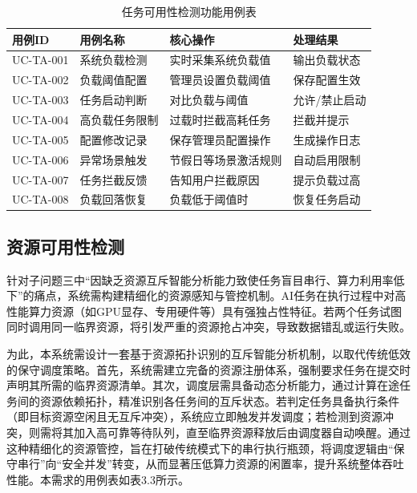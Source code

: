 \begin{table}[htbp]
    \centering
    \caption{任务可用性检测功能用例表}
    \begin{tabular}{llll}
        \toprule
        \textbf{用例ID} & \textbf{用例名称} & \textbf{核心操作} & \textbf{处理结果} \\
        \midrule
        UC-TA-001 & 系统负载检测 & 实时采集系统负载值 & 输出负载状态 \\
        UC-TA-002 & 负载阈值配置 & 管理员设置负载阈值 & 保存配置生效 \\
        UC-TA-003 & 任务启动判断 & 对比负载与阈值 & 允许/禁止启动 \\
        UC-TA-004 & 高负载任务限制 & 过载时拦截高耗任务 & 拦截并提示 \\
        UC-TA-005 & 配置修改记录 & 保存管理员配置操作 & 生成操作日志 \\
        UC-TA-006 & 异常场景触发 & 节假日等场景激活规则 & 自动启用限制 \\
        UC-TA-007 & 任务拦截反馈 & 告知用户拦截原因 & 提示负载过高 \\
        UC-TA-008 & 负载回落恢复 & 负载低于阈值时 & 恢复任务启动 \\
        \bottomrule
    \end{tabular}
    \label{tab:task_availability_cases}
\end{table}

\subsection{资源可用性检测}

针对子问题三中“因缺乏资源互斥智能分析能力致使任务盲目串行、算力利用率低下”的痛点，系统需构建精细化的资源感知与管控机制。AI任务在执行过程中对高性能算力资源（如GPU显存、专用硬件等）具有强独占性特征。若两个任务试图同时调用同一临界资源，将引发严重的资源抢占冲突，导致数据错乱或运行失败。

为此，本系统需设计一套基于资源拓扑识别的互斥智能分析机制，以取代传统低效的保守调度策略。首先，系统需建立完备的资源注册体系，强制要求任务在提交时声明其所需的临界资源清单。其次，调度层需具备动态分析能力，通过计算在途任务间的资源依赖拓扑，精准识别各任务间的互斥状态。若判定任务具备执行条件（即目标资源空闲且无互斥冲突），系统应立即触发并发调度；若检测到资源冲突，则需将其加入高可靠等待队列，直至临界资源释放后由调度器自动唤醒。通过这种精细化的资源管控，旨在打破传统模式下的串行执行瓶颈，将调度逻辑由“保守串行”向“安全并发”转变，从而显著压低算力资源的闲置率，提升系统整体吞吐性能。本需求的用例表如表3.3所示。

